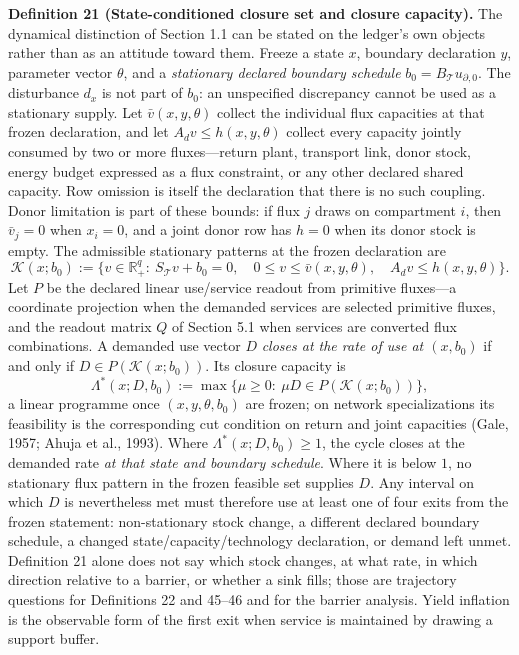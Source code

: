 \documentclass[11pt]{article}
\begin{document}
\textbf{Definition 21 (State-conditioned closure set and closure capacity).} The dynamical distinction of Section 1.1 can be stated on the ledger's own objects rather than as an attitude toward them. Freeze a state \(x\), boundary declaration \(y\), parameter vector \(\theta\), and a \emph{stationary declared boundary schedule} \(b_0=B_{\mathcal{T}}u_{\partial,0}\). The disturbance \(d_x\) is not part of \(b_0\): an unspecified discrepancy cannot be used as a stationary supply. Let \(\bar v(x,y,\theta)\) collect the individual flux capacities at that frozen declaration, and let \(A_dv\le h(x,y,\theta)\) collect every capacity jointly consumed by two or more fluxes---return plant, transport link, donor stock, energy budget expressed as a flux constraint, or any other declared shared capacity. Row omission is itself the declaration that there is no such coupling. Donor limitation is part of these bounds: if flux \(j\) draws on compartment \(i\), then \(\bar v_j=0\) when \(x_i=0\), and a joint donor row has \(h=0\) when its donor stock is empty. The admissible stationary patterns at the frozen declaration are
$$\mathcal K(x;b_0):=\{v\in\mathbb R_+^q:\ S_{\mathcal{T}}v+b_0=0,\quad 0\le v\le\bar v(x,y,\theta),\quad A_dv\le h(x,y,\theta)\}.$$
Let \(P\) be the declared linear use/service readout from primitive fluxes---a coordinate projection when the demanded services are selected primitive fluxes, and the readout matrix \(Q\) of Section 5.1 when services are converted flux combinations. A demanded use vector \(D\) \emph{closes at the rate of use at \((x,b_0)\)} if and only if \(D\in P(\mathcal K(x;b_0))\). Its closure capacity is
$$\Lambda^*(x;D,b_0):=\max\{\mu\ge0:\ \mu D\in P(\mathcal K(x;b_0))\},$$
a linear programme once \((x,y,\theta,b_0)\) are frozen; on network specializations its feasibility is the corresponding cut condition on return and joint capacities (Gale, 1957; Ahuja et al., 1993). Where \(\Lambda^*(x;D,b_0)\ge1\), the cycle closes at the demanded rate \emph{at that state and boundary schedule}. Where it is below \(1\), no stationary flux pattern in the frozen feasible set supplies \(D\). Any interval on which \(D\) is nevertheless met must therefore use at least one of four exits from the frozen statement: non-stationary stock change, a different declared boundary schedule, a changed state/capacity/technology declaration, or demand left unmet. Definition 21 alone does not say which stock changes, at what rate, in which direction relative to a barrier, or whether a sink fills; those are trajectory questions for Definitions 22 and 45--46 and for the barrier analysis. Yield inflation is the observable form of the first exit when service is maintained by drawing a support buffer.
\end{document}
